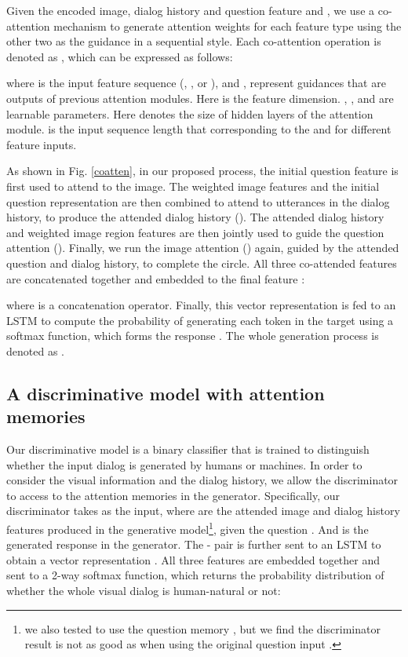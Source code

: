 \documentclass[10pt,twocolumn,letterpaper]{article}
\begin{document}
Given the encoded image, dialog history and question feature  and , we use a co-attention mechanism to generate attention weights for each feature type using the other two as the guidance in a sequential style. Each co-attention operation is denoted as , which can be expressed as follows:

where  is the input feature sequence (\ie, ,  or ),
and ,  represent guidances that are outputs of previous attention modules. Here  is the feature dimension. , ,  and  are learnable parameters. Here  denotes the size of hidden layers of the attention module.  is the input sequence length that corresponding to the  and  for different feature inputs.

As shown in Fig. \ref{coatten}, in our proposed process, the initial question feature is first used to attend to the image. The weighted image features and the initial question representation are then combined to attend to utterances in the dialog history, to produce the attended dialog history (). The attended dialog history and weighted image region features are then jointly used to guide the question attention (). Finally, we run the image attention () again, guided by the attended question and dialog history, to complete the circle. All three co-attended features are concatenated together and embedded to the final feature :

where  is a concatenation operator. Finally, this vector representation is fed to an LSTM to compute the probability of generating each token in the target using a softmax function, which forms the response . The whole generation process is denoted as .

\subsection{A discriminative model with attention memories}
\label{discriminator}
Our discriminative model is a binary classifier that is trained to distinguish whether the input dialog is generated by humans or machines. In order to consider the visual information and the dialog history, we allow the discriminator to access to the attention memories in the generator. Specifically, our discriminator takes  as the input, where  are the attended image and dialog history features produced in the generative model\footnote{we also tested to use the question memory , but we find the discriminator result is not as good as when using the original question input .}, given the question . And  is the generated response in the generator. The - pair is further sent to an LSTM to obtain a vector representation . All three features are embedded together and sent to a 2-way softmax function, which returns the probability distribution of whether the whole visual dialog is human-natural or not:
 
\end{document}
